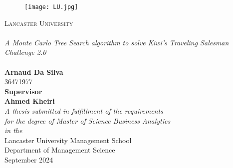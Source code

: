 \begin{titlepage}
\begin{center}

\begin{figure}[htbp]
\centering
\texttt{[image: LU.jpg]}
\end{figure}

\textsc{\LARGE Lancaster University}\\[0.7cm] 
\HRule \\[0.7cm]
{\huge \textit{A Monte Carlo Tree Search algorithm to solve Kiwi's Traveling Salesman Challenge 2.0}}\\[0.4cm]
\HRule \\[0.7cm]
{\LARGE \bfseries Arnaud Da Silva}\\[0.4cm]
{\LARGE  36471977}\\[1cm]
{\large  \bfseries Supervisor }\\[0.4cm]
{\large \bfseries Ahmed Kheiri}\\[1cm]
\large \textit{A thesis submitted in fulfillment of the requirements\\ for the degree of Master of Science Business Analytics}\\[0.3cm] %
\textit{in the}\\[0.4cm]
Lancaster University Management School \\
Department of Management Science\\[1cm] %
{\large September 2024}\\[4cm]
\vfill
\end{center}
\end{titlepage}
